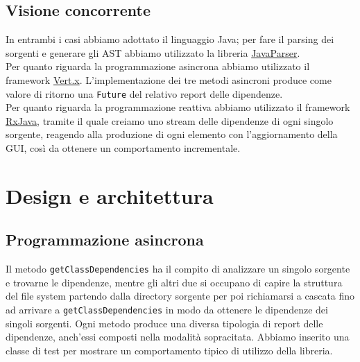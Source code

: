 \documentclass[a4paper,12pt]{report}
\begin{document}
\section{Visione concorrente}
In entrambi i casi abbiamo adottato il linguaggio Java; per fare il parsing dei sorgenti e generare gli AST abbiamo utilizzato la libreria \href{https://javaparser.org/}{JavaParser}.\\
Per quanto riguarda la programmazione asincrona abbiamo utilizzato il framework \href{https://vertx.io/}{Vert.x}. 
L'implementazione dei tre metodi asincroni produce come valore di ritorno una \texttt{Future} del relativo report delle dipendenze.\\
Per quanto riguarda la programmazione reattiva abbiamo utilizzato il framework \href{https://github.com/ReactiveX/RxJava}{RxJava}, tramite il quale creiamo uno stream delle dipendenze di ogni singolo sorgente, reagendo alla produzione di ogni elemento con l'aggiornamento della GUI, così da ottenere un comportamento incrementale.

\chapter{Design e architettura}
\section{Programmazione asincrona}
Il metodo \texttt{getClassDependencies} ha il compito di analizzare un singolo sorgente e trovarne le dipendenze, mentre gli altri due si occupano di capire la struttura del file system partendo dalla directory sorgente per poi richiamarsi a cascata fino ad arrivare a \texttt{getClassDependencies} in modo da ottenere le dipendenze dei singoli sorgenti.
Ogni metodo produce una diversa tipologia di report delle dipendenze, anch'essi composti nella modalità sopracitata.
Abbiamo inserito una classe di test per mostrare un comportamento tipico di utilizzo della libreria.
\end{document}
